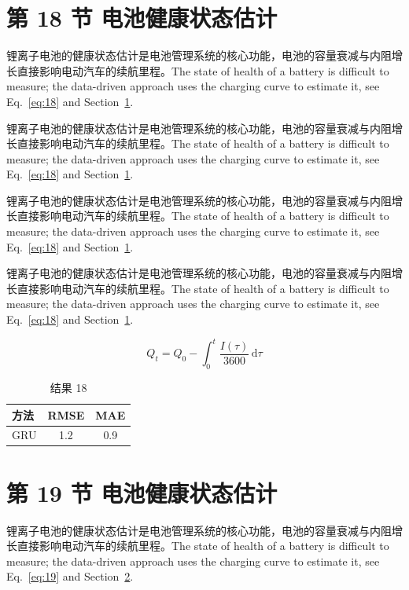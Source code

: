 \documentclass[UTF8,fontset=mac]{ctexart}
\begin{document}
\section{第 18 节 电池健康状态估计}\label{sec:18}
锂离子电池的健康状态估计是电池管理系统的核心功能，电池的容量衰减与内阻增长直接影响电动汽车的续航里程\cite{a2020}。The state of health of a battery is difficult to measure; the data-driven approach uses the charging curve to estimate it, see Eq.~\eqref{eq:18} and Section~\ref{sec:18}.

锂离子电池的健康状态估计是电池管理系统的核心功能，电池的容量衰减与内阻增长直接影响电动汽车的续航里程\cite{a2020}。The state of health of a battery is difficult to measure; the data-driven approach uses the charging curve to estimate it, see Eq.~\eqref{eq:18} and Section~\ref{sec:18}.

锂离子电池的健康状态估计是电池管理系统的核心功能，电池的容量衰减与内阻增长直接影响电动汽车的续航里程\cite{a2020}。The state of health of a battery is difficult to measure; the data-driven approach uses the charging curve to estimate it, see Eq.~\eqref{eq:18} and Section~\ref{sec:18}.

锂离子电池的健康状态估计是电池管理系统的核心功能，电池的容量衰减与内阻增长直接影响电动汽车的续航里程\cite{a2020}。The state of health of a battery is difficult to measure; the data-driven approach uses the charging curve to estimate it, see Eq.~\eqref{eq:18} and Section~\ref{sec:18}.

\begin{equation}\label{eq:18}
  Q_t = Q_0 - \int_0^t \frac{I(\tau)}{3600}\,\mathrm{d}\tau
\end{equation}
\begin{table}[h]\centering\begin{tabular}{lcc}\toprule 方法 & RMSE & MAE\\\midrule GRU & 1.2 & 0.9\\\bottomrule\end{tabular}\caption{结果 18}\end{table}

\section{第 19 节 电池健康状态估计}\label{sec:19}
锂离子电池的健康状态估计是电池管理系统的核心功能，电池的容量衰减与内阻增长直接影响电动汽车的续航里程\cite{a2020}。The state of health of a battery is difficult to measure; the data-driven approach uses the charging curve to estimate it, see Eq.~\eqref{eq:19} and Section~\ref{sec:19}.
\end{document}
